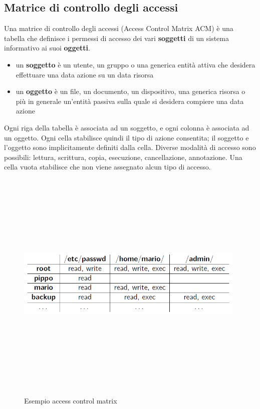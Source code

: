 \subsection{Matrice di controllo degli accessi} 
Una matrice di controllo degli accessi (Access Control Matrix ACM) è una tabella che definisce i permessi di accesso dei vari \textbf{soggetti} di un sistema informativo ai suoi \textbf{oggetti}.
\begin{itemize} 
  \item un \textbf{soggetto} è un utente, un gruppo o una generica entità attiva che desidera effettuare una data azione su un data risorsa
  \item un \textbf{oggetto} è un file, un documento, un dispositivo, una generica risorsa o più in generale un'entità passiva sulla quale si desidera compiere una data azione
\end{itemize}

Ogni riga della tabella è associata ad un soggetto, e ogni colonna è associata ad un oggetto. Ogni cella stabilisce quindi il tipo di azione consentita; il soggetto e l'oggetto sono implicitamente definiti dalla cella. Diverse modalità di accesso sono possibili: lettura, scrittura, copia, esecuzione, cancellazione, annotazione. Una cella vuota stabilisce che non viene assegnato alcun tipo di accesso.
\begin{figure}[htbp]
	\centering%
	\subfigure%
	{\includegraphics[height=11cm, width=11cm, keepaspectratio]{Immagini/introduzione/access_control_matrix_ex.png}}
	\caption{Esempio access control matrix \label{fig:acm}} 	
\end{figure}

